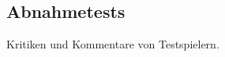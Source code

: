 %



\newpage



\label{Abschnitt:Tests:Protokoll:Abnahme}



\subsection*{Abnahmetests}

Kritiken und Kommentare von Testspielern.





